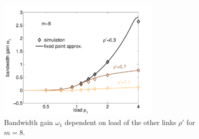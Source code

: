 \begin{figure}[tb]
	\centering
	\includegraphics[width=0.7\textwidth]{aggregation/performance_model/figures/fp_bwgain_m8}
 	\caption{Bandwidth gain $\omega_1$ dependent on load of the other links $\rho'$ for $m=8$.}
 	\label{fig:bwgain_m8}
\end{figure}


